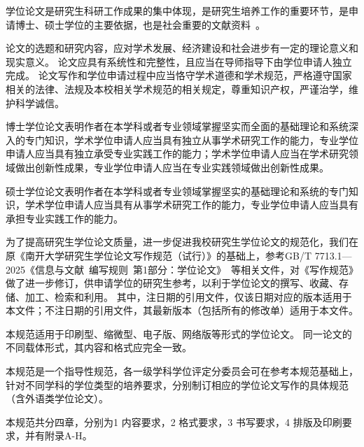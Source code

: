 \begin{preface}
    学位论文是研究生科研工作成果的集中体现，是研究生培养工作的重要环节，是申请博士、硕士学位的主要依据，也是社会重要的文献资料~\cite{REF00000001}。

    论文的选题和研究内容，应对学术发展、经济建设和社会进步有一定的理论意义和现实意义。
    论文应具有系统性和完整性，且应当在导师指导下由学位申请人独立完成。
    论文写作和学位申请过程中应当恪守学术道德和学术规范，严格遵守国家相关的法律、法规及本校相关学术规范的相关规定，尊重知识产权，严谨治学，维护科学诚信。

    博士学位论文表明作者在本学科或者专业领域掌握坚实而全面的基础理论和系统深入的专门知识，学术学位申请人应当具有独立从事学术研究工作的能力，专业学位申请人应当具有独立承受专业实践工作的能力；学术学位申请人应当在学术研究领域做出创新性成果，专业学位申请人应当在专业实践领域做出创新性成果。

    硕士学位论文表明作者在本学科或者专业领域掌握坚实的基础理论和系统的专门知识，学术学位申请人应当具有从事学术研究工作的能力，专业学位申请人应当具有承担专业实践工作的能力。

    为了提高研究生学位论文质量，进一步促进我校研究生学位论文的规范化，我们在原《南开大学研究生学位论文写作规范（试行）》的基础上，参考GB/T 7713.1—2025《信息与文献~编写规则~第1部分：学位论文》~\cite{SCSF00000378}等相关文件，对《写作规范》做了进一步修订，供申请学位的研究生参考，以利于学位论文的撰写、收藏、存储、加工、检索和利用。
    其中，注日期的引用文件，仅该日期对应的版本适用于本文件；不注日期的引用文件，其最新版本（包括所有的修改单）适用于本文件。

    本规范适用于印刷型、缩微型、电子版、网络版等形式的学位论文。
    同一论文的不同载体形式，其内容和格式应完全一致。

    本规范是一个指导性规范，各一级学科学位评定分委员会可在参考本规范基础上，针对不同学科的学位类型的培养要求，分别制订相应的学位论文写作的具体规范（含外语类学位论文）。

    本规范共分四章，分别为1 内容要求，2 格式要求，3 书写要求，4 排版及印刷要求，并有附录A-H。
\end{preface}
